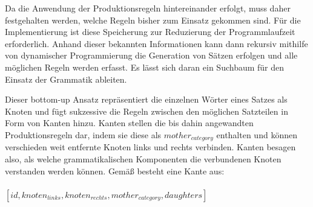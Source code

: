 \documentclass[12pt]{report}
\begin{document}
Da die Anwendung der Produktionsregeln hintereinander erfolgt, muss daher festgehalten werden, welche Regeln bisher zum Einsatz gekommen sind. Für die Implementierung ist diese Speicherung zur Reduzierung der Programmlaufzeit erforderlich. Anhand dieser bekannten Informationen kann dann rekursiv mithilfe von dynamischer Programmierung die Generation von Sätzen erfolgen und alle möglichen Regeln werden erfasst. Es lässt sich daran ein Suchbaum für den Einsatz der Grammatik ableiten. 

Dieser bottom-up Ansatz repräsentiert die einzelnen Wörter eines Satzes als Knoten und fügt sukzessive die Regeln zwischen den möglichen Satzteilen in Form von Kanten hinzu. Kanten stellen die bis dahin angewandten Produktionsregeln dar, indem sie diese als \textit{$mother_{category}$} enthalten und können verschieden weit entfernte Knoten links und rechts verbinden. Kanten besagen also, als welche grammatikalischen Komponenten die verbundenen Knoten verstanden werden können. Gemäß \cite{cop04} besteht eine Kante aus:
\\
\tt
\\$[id, knoten_{links}, knoten_{rechts}, mother_{category}, daughters]$
\rm
\\
\end{document}
